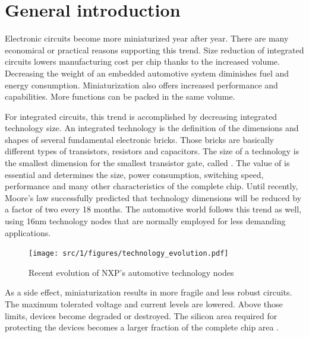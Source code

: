 \section{General introduction}

Electronic circuits become more miniaturized year after year.
There are many economical or practical reasons supporting this trend.
Size reduction of integrated circuits lowers manufacturing cost per chip thanks to the increased volume.
Decreasing the weight of an embedded automotive system diminishes fuel and energy consumption.
Miniaturization also offers increased performance and capabilities.
More functions can be packed in the same volume.

For integrated circuits, this trend is accomplished by decreasing integrated technology size.
An integrated technology is the definition of the dimensions and shapes of several fundamental electronic bricks.
Those bricks are basically different types of transistors, resistors and capacitors.
The size of a technology is the smallest dimension for the smallest transistor gate, called \textlambda.
The value of \textlamda is essential and determines the size, power consumption, switching speed, performance and many other characteristics of the complete chip.
Until recently, Moore's law successfully predicted that technology dimensions will be reduced by a factor of two every 18 months.
The automotive world follows this trend as well, using 16nm technology nodes \cite{evolution_technologies} that are normally employed for less demanding applications.

\begin{figure}[!h]
  \centering
  \texttt{[image: src/1/figures/technology\_evolution.pdf]}
  \caption{Recent evolution of NXP's automotive technology nodes \cite{evolution_technologies}}
  \label{fig:nxp-techno-increase}
\end{figure}

As a side effect, miniaturization results in more fragile and less robust circuits.
The maximum tolerated voltage and current levels are lowered.
Above those limits, devices become degraded or destroyed.
The silicon area required for protecting the devices becomes a larger fraction of the complete chip area \cite{evolution_technologies}.

